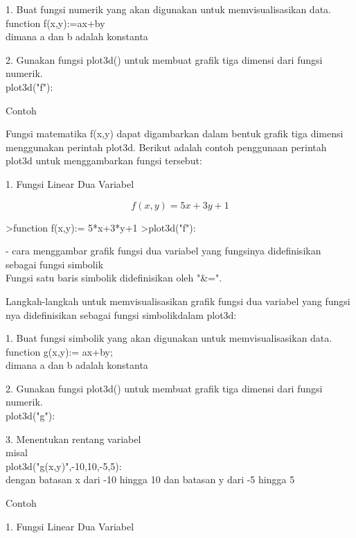 \documentclass[a4paper,10pt]{article}
\begin{document}
\begin{eulernotebook}
\begin{eulercomment}
\begin{eulercomment}
\begin{eulercomment}
1. Buat fungsi numerik yang akan digunakan untuk memvisualisasikan
data.\\
function f(x,y):=ax+by\\
dimana a dan b adalah konstanta

2. Gunakan fungsi plot3d() untuk membuat grafik tiga dimensi dari
fungsi numerik.\\
plot3d("f"):

Contoh

Fungsi matematika f(x,y) dapat digambarkan dalam bentuk grafik tiga
dimensi menggunakan perintah plot3d. Berikut adalah contoh penggunaan
perintah plot3d untuk menggambarkan fungsi tersebut:

1. Fungsi Linear Dua Variabel

\end{eulercomment}
\begin{eulerformula}
\[
f(x,y)=5x+3y+1
\]
\end{eulerformula}
\begin{eulerprompt}
>function f(x,y):= 5*x+3*y+1
>plot3d("f"):
\end{eulerprompt}
\begin{eulercomment}
- cara menggambar grafik fungsi dua variabel yang fungsinya
didefinisikan sebagai fungsi simbolik\\
Fungsi satu baris simbolik didefinisikan oleh "\&=".

Langkah-langkah untuk memvisualisasikan grafik fungsi dua variabel
yang fungsi nya didefinisikan sebagai fungsi simbolikdalam plot3d:

1. Buat fungsi simbolik yang akan digunakan untuk memvisualisasikan
data.\\
function g(x,y):= ax+by;\\
dimana a dan b adalah konstanta

2. Gunakan fungsi plot3d() untuk membuat grafik tiga dimensi dari
fungsi numerik.\\
plot3d("g"):

3. Menentukan rentang variabel\\
misal\\
plot3d("g(x,y)",-10,10,-5,5):\\
dengan batasan x dari -10 hingga 10 dan batasan y dari -5 hingga 5

Contoh

1. Fungsi Linear Dua Variabel


\end{eulercomment}
\end{eulercomment}
\end{eulercomment}
\end{eulernotebook}
\end{document}
